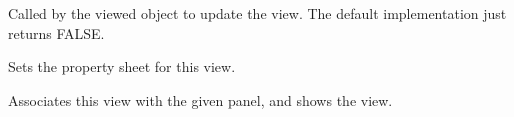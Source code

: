 Called by the viewed object to update the view. The default implementation just returns
FALSE.

\label{wxpropertyviewsetpropertysheet}


Sets the property sheet for this view.

\label{wxpropertyviewshowview}


Associates this view with the given panel, and shows the view.


